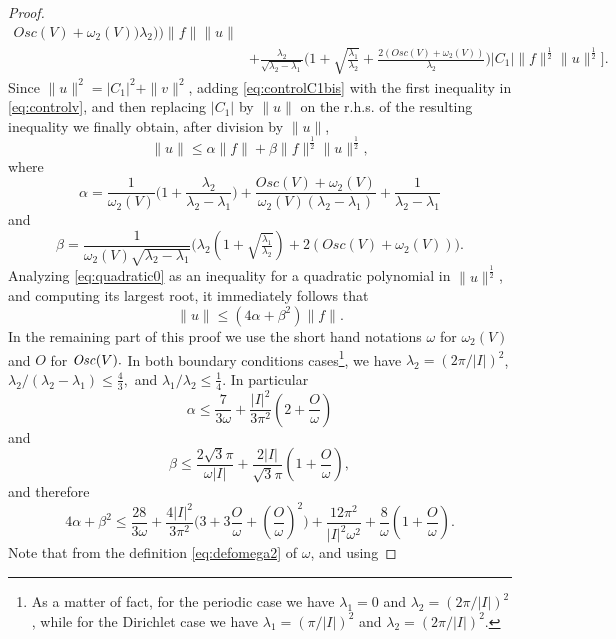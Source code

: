 \documentclass[10pt,a4paper]{amsart}
\begin{document}
\begin{proof}
\begin{equation}
\begin{split}
{	Osc(V) + \omega_2(V))}{\lambda_2}\big)\Big)
	\|f\| \|u\|\\
	& + \frac{\lambda_2}{\sqrt{\lambda_2-\lambda_1}}\Big(1 +
	\sqrt{\frac{\lambda_1}{\lambda_2}} + \frac{2(Osc(V) + \omega_2(V))}{\lambda_2}\Big)
	|C_1| \|f\|^\frac12 \|u\|^\frac12 \Bigg]. 
\end{split}
\end{equation} 
Since $\|u\|^2 = |C_1|^2 + \|v\|^2$, adding \eqref{eq:controlC1bis} with 
the first inequality in \eqref{eq:controlv}, and then replacing $|C_1|$ by $\|u\|$ on the
r.h.s. of the resulting inequality we finally obtain, after division by $\|u\|$, 
\begin{equation}\label{eq:quadratic0}
\|u\| \leq \alpha \|f\| + \beta \|f\|^\frac12 \|u\|^\frac12,
\end{equation}
where
$$
\alpha = \frac{1}{\omega_2(V)}\Big( 1 + 
    \frac{\lambda_2}{\lambda_2- \lambda_1}\Big) + \frac{Osc(V) + \omega_2(V)}{\omega_2(V)
    (\lambda_2 - \lambda_1)} +\frac{1}{\lambda_2 - \lambda_1} 
$$
and
$$
\beta = \frac{1}{\omega_2(V) \sqrt{\lambda_2-\lambda_1}} \Big(\lambda_2(1 +
	\sqrt{\tfrac{\lambda_1}{\lambda_2}})  + 2(Osc(V) + \omega_2(V))\Big).
$$
Analyzing \eqref{eq:quadratic0} as an inequality for a quadratic polynomial in
$\|u\|^\frac{1}{2}$, and computing its largest root, it immediately follows 
that  
\begin{equation}\label{eq:case2}
\|u\| \leq (4\alpha + \beta^2) \|f\|.
\end{equation}
In the remaining part of this proof we use the short hand notations $\omega$ for
$\omega_2(V)$ and $O$ for ${\it Osc}(V).$ In both boundary conditions 
cases\footnote{As a matter of fact, for the periodic case we have 
$\lambda_1=0$ and $\lambda_2=(2\pi/|I|)^2$, while for the Dirichlet case we 
have $\lambda_1=(\pi/|I|)^2$ and $\lambda_2=(2\pi/|I|)^2$.}, we have $\lambda_2 = (2\pi/|I|)^2$,
$\lambda_2 / (\lambda_2 - \lambda_1) \leq \frac{4}{3},$ and $\lambda_1 /
\lambda_2 \leq \frac{1}{4}$. In particular
$$
\alpha \leq \frac{7}{3 \omega} + \frac{|I|^2}{3\pi^2}\left(2 + 
\frac{O}{\omega}\right)
$$
and
$$
\beta \leq \frac{2\sqrt{3}\pi}{\omega|I|} + \frac{2|I|}{\sqrt{3}\pi}\left( 1 +
\frac{O}{\omega}\right),
$$
and therefore
\begin{equation}\label{eq:boundalphabeta}
4\alpha + \beta^2 \leq \frac{28}{3\omega} + \frac{4|I|^2}{3\pi^2}
\big(3 + 3\frac{O}{\omega} + (\frac{O}{\omega})^2\big)  
+ \frac{12\pi^2}{|I|^2\omega^2} + \frac{8}{\omega}(1 +  \frac{O}{\omega}).
\end{equation}
Note that from the definition \eqref{eq:defomega2} of $\omega$, and using

\end{proof}
\end{document}
